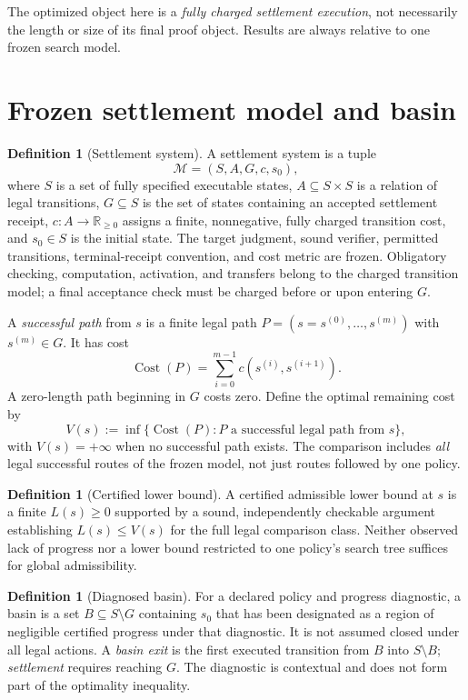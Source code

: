 \documentclass[11pt,letterpaper]{article}
\theoremstyle{definition}\newtheorem{definition}[theorem]{Definition}\newtheorem{example}[theorem]{Example}
\theoremstyle{remark}\newtheorem{remark}[theorem]{Remark}
\newcommand{\RR}{\mathbb R}
\newcommand{\Costs}{\operatorname{Cost}}
\begin{document}
The optimized object here is a \emph{fully charged settlement execution}, not necessarily the length or size of its final proof object. Results are always relative to one frozen search model.

\section{Frozen settlement model and basin}
\begin{definition}[Settlement system]
A settlement system is a tuple
\[
 \mathcal M=(S,A,G,c,s_0),
\]
where $S$ is a set of fully specified executable states, $A\subseteq S\times S$ is a relation of legal transitions, $G\subseteq S$ is the set of states containing an accepted settlement receipt, $c:A\to\RR_{\ge0}$ assigns a finite, nonnegative, fully charged transition cost, and $s_0\in S$ is the initial state. The target judgment, sound verifier, permitted transitions, terminal-receipt convention, and cost metric are frozen. Obligatory checking, computation, activation, and transfers belong to the charged transition model; a final acceptance check must be charged before or upon entering $G$.
\end{definition}
A \emph{successful path} from $s$ is a finite legal path $P=(s=s^{(0)},\ldots,s^{(m)})$ with $s^{(m)}\in G$. It has cost
\[
 \Costs(P)=\sum_{i=0}^{m-1}c(s^{(i)},s^{(i+1)}).
\]
A zero-length path beginning in $G$ costs zero. Define the optimal remaining cost by
\[
 V(s):=\inf\{\Costs(P):P\text{ a successful legal path from }s\},
\]
with $V(s)=+\infty$ when no successful path exists. The comparison includes \emph{all} legal successful routes of the frozen model, not just routes followed by one policy.

\begin{definition}[Certified lower bound]
A certified admissible lower bound at $s$ is a finite $L(s)\ge0$ supported by a sound, independently checkable argument establishing $L(s)\le V(s)$ for the full legal comparison class. Neither observed lack of progress nor a lower bound restricted to one policy's search tree suffices for global admissibility.
\end{definition}
\begin{definition}[Diagnosed basin]
For a declared policy and progress diagnostic, a basin is a set $B\subseteq S\setminus G$ containing $s_0$ that has been designated as a region of negligible certified progress under that diagnostic. It is not assumed closed under all legal actions. A \emph{basin exit} is the first executed transition from $B$ into $S\setminus B$; \emph{settlement} requires reaching $G$. The diagnostic is contextual and does not form part of the optimality inequality.
\end{definition}
\end{document}
